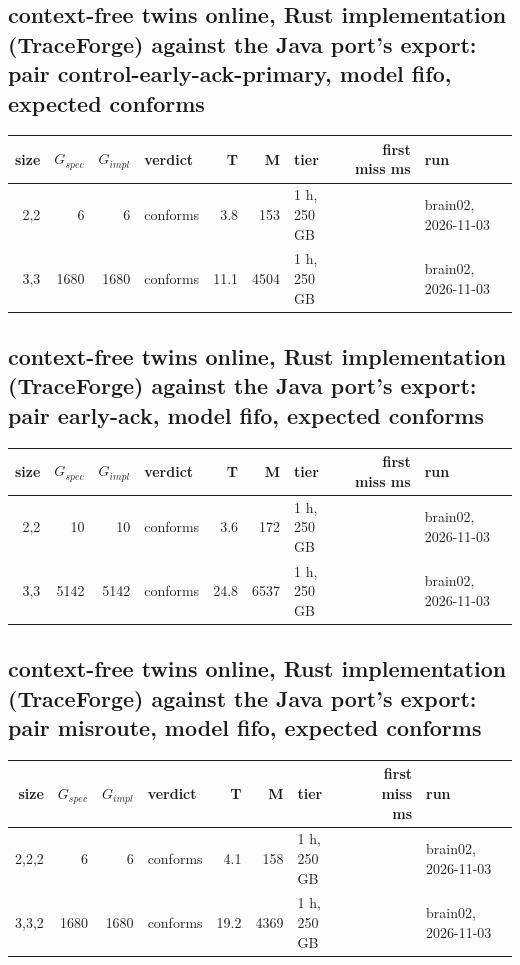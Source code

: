 \documentclass[10pt]{article}
\begin{document}
\subsection*{context-free twins online, Rust implementation (TraceForge) against the Java port's export: pair \textsf{control-early-ack-primary}, model fifo, expected conforms}
\begin{longtable}{@{}rrrlrrlrl@{}}
\toprule
size & $G_{\mathit{spec}}$ & $G_{\mathit{impl}}$ & verdict & T & M & tier & first miss ms & run \\
\midrule
\endhead
\color{red} 2,2 & 6 & 6 & conforms & 3.8 & 153 & 1 h, 250 GB &  & brain02, 2026-11-03 \\
\color{red} 3,3 & 1680 & 1680 & conforms & 11.1 & 4504 & 1 h, 250 GB &  & brain02, 2026-11-03 \\
\bottomrule
\end{longtable}
\subsection*{context-free twins online, Rust implementation (TraceForge) against the Java port's export: pair \textsf{early-ack}, model fifo, expected conforms}
\begin{longtable}{@{}rrrlrrlrl@{}}
\toprule
size & $G_{\mathit{spec}}$ & $G_{\mathit{impl}}$ & verdict & T & M & tier & first miss ms & run \\
\midrule
\endhead
\color{red} 2,2 & 10 & 10 & conforms & 3.6 & 172 & 1 h, 250 GB &  & brain02, 2026-11-03 \\
\color{red} 3,3 & 5142 & 5142 & conforms & 24.8 & 6537 & 1 h, 250 GB &  & brain02, 2026-11-03 \\
\bottomrule
\end{longtable}
\subsection*{context-free twins online, Rust implementation (TraceForge) against the Java port's export: pair \textsf{misroute}, model fifo, expected conforms}
\begin{longtable}{@{}rrrlrrlrl@{}}
\toprule
size & $G_{\mathit{spec}}$ & $G_{\mathit{impl}}$ & verdict & T & M & tier & first miss ms & run \\
\midrule
\endhead
\color{red} 2,2,2 & 6 & 6 & conforms & 4.1 & 158 & 1 h, 250 GB &  & brain02, 2026-11-03 \\
\color{red} 3,3,2 & 1680 & 1680 & conforms & 19.2 & 4369 & 1 h, 250 GB &  & brain02, 2026-11-03 \\
\bottomrule
\end{longtable}
\end{document}

